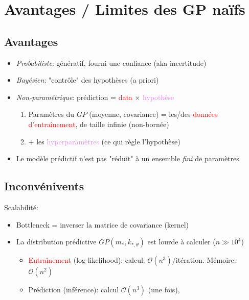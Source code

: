 \documentclass[xcolor=svgnames, t]{beamer}
\newcommand{\coloredemph}[1]{\textcolor{internationalblue}{\emph{#1}}}
\newcommand{\tored}[1]{\textcolor{red}{#1}}
\newcommand{\toblue}[1]{\textcolor{internationalblue}{#1}}
\newcommand{\topurple}[1]{\textcolor{violet}{#1}}
\begin{document}
\section{Avantages / Limites des GP naïfs}

\subsection{Avantages}
\begin{frame}{\subsecname}
  \begin{itemize}
    \item \coloredemph{Probabiliste}: génératif, fourni une confiance (aka incertitude)
    \pause
    \item \coloredemph{Bayésien}: "contrôle" des hypothèses (a priori)
    \pause
    \item \coloredemph{Non-paramétrique}: \toblue{prédiction} = \tored{data} $\times$ \topurple{hypothèse}
      \begin{enumerate}
        \item Paramètres du $GP$ (moyenne, covariance) = les/des \tored{données d'entraînement}, de taille infinie (non-bornée)
        \pause
        \item $+$ les \topurple{hyperparamètres} (ce qui règle l'hypothèse)
      \end{enumerate}
    \pause
    \item Le modèle prédictif n'est pas "réduit" à un ensemble \coloredemph{fini} de paramètres
  \end{itemize}
\end{frame}

\subsection{Inconvénivents}
\begin{frame}{\subsecname}
  Scalabilité:
  \begin{itemize}
    \item Bottleneck = inverser la matrice de covariance (kernel)
    \item La distribution prédictive $GP( m_{*}, k_{*, \theta} )$ est lourde à calculer ($n \gg 10^4$)
      \begin{itemize}
        \item \tored{Entraînement} (log-likelihood): calcul: $\mathcal{O}(n^3)$/itération. Mémoire: $\mathcal{O}(n^2)$
        \item \toblue{Prédiction} (inférence): calcul $\mathcal{O}(n^3)$ (une fois), 
      \end{itemize}
  \end{itemize}
\end{frame}
\end{document}
